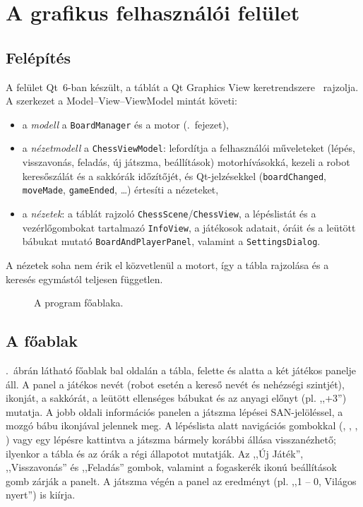 \chapter{A grafikus felhasználói felület}\label{chap:gui}

\section{Felépítés}

A felület Qt~6-ban készült, a táblát a Qt Graphics View keretrendszere~\cite{QtGraphicsView} rajzolja. A szerkezet a Model--View--ViewModel mintát követi:
\begin{itemize}
	\item a \emph{modell} a \texttt{BoardManager} és a motor (.~fejezet),
	\item a \emph{nézetmodell} a \texttt{ChessViewModel}: lefordítja a felhasználói műveleteket (lépés, visszavonás, feladás, új játszma, beállítások) motorhívásokká, kezeli a robot keresőszálát és a sakkórák időzítőjét, és Qt-jelzésekkel (\texttt{boardChanged}, \texttt{moveMade}, \texttt{gameEnded}, \ldots) értesíti a nézeteket,
	\item a \emph{nézetek}: a táblát rajzoló \texttt{ChessScene}/\texttt{ChessView}, a lépéslistát és a vezérlőgombokat tartalmazó \texttt{InfoView}, a játékosok adatait, óráit és a leütött bábukat mutató \texttt{BoardAndPlayerPanel}, valamint a \texttt{SettingsDialog}.
\end{itemize}
A nézetek soha nem érik el közvetlenül a motort, így a tábla rajzolása és a keresés egymástól teljesen független.

\begin{figure}[H]
	\centering
	\caption{A program főablaka.}
	\label{fig:guiMain}
\end{figure}

\section{A főablak}

.~ábrán látható főablak bal oldalán a tábla, felette és alatta a két játékos panelje áll. A panel a játékos nevét (robot esetén a kereső nevét és nehézségi szintjét), ikonját, a sakkórát, a leütött ellenséges bábukat és az anyagi előnyt (pl. ,,+3'') mutatja. A jobb oldali információs panelen a játszma lépései SAN-jelöléssel, a mozgó bábu ikonjával jelennek meg. A lépéslista alatt navigációs gombokkal (\guillemotleft, \guilsinglleft, \guilsinglright, \guillemotright) vagy egy lépésre kattintva a játszma bármely korábbi állása visszanézhető; ilyenkor a tábla és az órák a régi állapotot mutatják. Az ,,Új Játék'', ,,Visszavonás'' és ,,Feladás'' gombok, valamint a fogaskerék ikonú beállítások gomb zárják a panelt. A játszma végén a panel az eredményt (pl. ,,1 -- 0, Világos nyert'') is kiírja.

